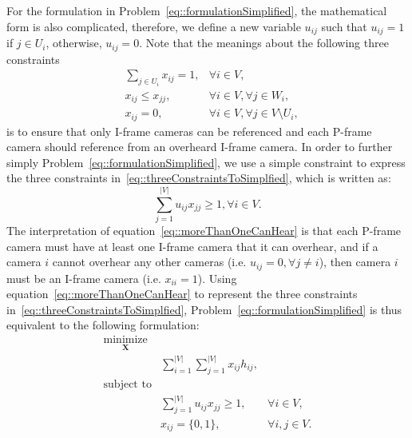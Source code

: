 For the formulation in Problem~\eqref{eq::formulationSimplified}, the mathematical form is also complicated, therefore, we define a new variable $u_{ij}$ such that $u_{ij} = 1$ if $j \in U_i$, otherwise, $u_{ij} = 0$.
Note that the meanings about the following three constraints
\begin{align}
&\sum_{j \in U_i} x_{ij} = 1, &\forall i \in V, \nonumber \\
&x_{ij} \leq x_{jj}, &\forall i \in V, \forall j \in W_i, \nonumber \\
&x_{ij} = 0, &\forall i \in V, \forall j \in V \setminus U_i,
\label{eq::threeConstraintsToSimplfied}
\end{align}
is to ensure that only I-frame cameras can be referenced and each P-frame camera should reference from an overheard I-frame camera.
In order to further simply Problem~\eqref{eq::formulationSimplified}, we use a simple constraint to express the three constraints in~\eqref{eq::threeConstraintsToSimplfied}, which is written as:
\begin{equation}
\sum_{j=1}^{|V|} u_{ij} x_{jj} \geq 1, \forall i \in V.
\label{eq::moreThanOneCanHear}
\end{equation}
The interpretation of equation~\eqref{eq::moreThanOneCanHear} is that each P-frame camera must have at least one I-frame camera that it can overhear, and if a camera $i$ cannot overhear any other cameras (i.e. $u_{ij} = 0, \forall j \neq i$), then camera $i$ must be an I-frame camera (i.e. $x_{ii}=1$).
Using equation~\eqref{eq::moreThanOneCanHear} to represent the three constraints in~\eqref{eq::threeConstraintsToSimplfied}, Problem~\eqref{eq::formulationSimplified} is thus equivalent to the following formulation:
\begin{align}
\underset{\mathbf{X}}{\text{minimize}} & & \nonumber \\
	&\sum_{i=1}^{|V|} \sum_{j=1}^{|V|}  x_{ij} h_{ij}, & \nonumber \\
\text{subject to} & & \nonumber \\
	&\sum_{j=1}^{|V|} u_{ij} x_{jj} \geq 1, &\forall i \in V, \nonumber \\
	&x_{ij} = \{0,1\}, &\forall i,j \in V.
\label{eq::formulationSimplifiedAsGraph}
\end{align}

